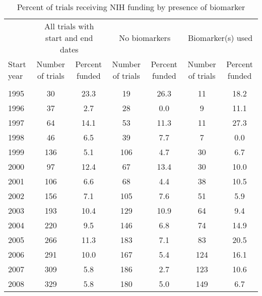 \begin{table}[htbp]\centering
\caption{Percent of trials receiving NIH funding by presence of biomarker}
\begin{tabular}{l*{3}{cc}}
\hline\hline
                    &\multicolumn{2}{c}{All trials with start and end dates}&\multicolumn{2}{c}{No biomarkers}&\multicolumn{2}{c}{Biomarker(s) used}\\
Start year          &Number of trials&Percent funded&Number of trials&Percent funded&Number of trials&Percent funded\\
\hline
                    &            &            &            &            &            &            \\
1995                &          30&        23.3&          19&        26.3&          11&        18.2\\
1996                &          37&         2.7&          28&         0.0&           9&        11.1\\
1997                &          64&        14.1&          53&        11.3&          11&        27.3\\
1998                &          46&         6.5&          39&         7.7&           7&         0.0\\
1999                &         136&         5.1&         106&         4.7&          30&         6.7\\
2000                &          97&        12.4&          67&        13.4&          30&        10.0\\
2001                &         106&         6.6&          68&         4.4&          38&        10.5\\
2002                &         156&         7.1&         105&         7.6&          51&         5.9\\
2003                &         193&        10.4&         129&        10.9&          64&         9.4\\
2004                &         220&         9.5&         146&         6.8&          74&        14.9\\
2005                &         266&        11.3&         183&         7.1&          83&        20.5\\
2006                &         291&        10.0&         167&         5.4&         124&        16.1\\
2007                &         309&         5.8&         186&         2.7&         123&        10.6\\
2008                &         329&         5.8&         180&         5.0&         149&         6.7\\

\end{tabular}
\end{table}
